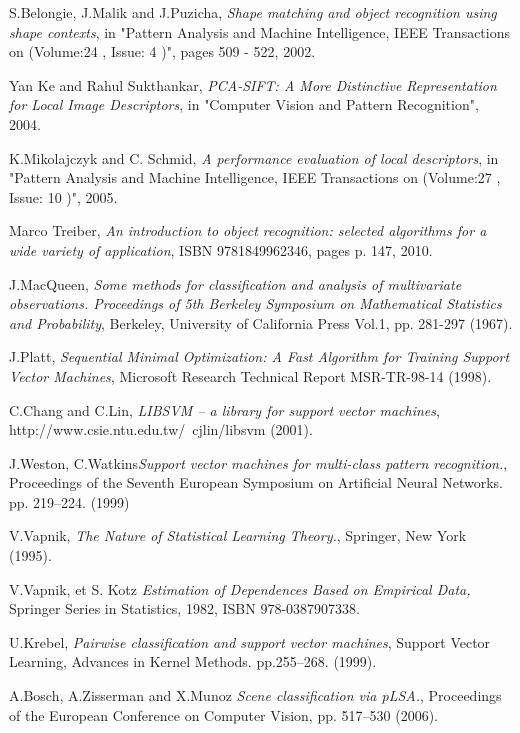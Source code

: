 \begin{thebibliography}{99}
 S.Belongie, J.Malik and J.Puzicha, \emph{Shape matching and object recognition using shape contexts}, in "Pattern Analysis and Machine Intelligence, IEEE Transactions on  (Volume:24 ,  Issue: 4 )", pages 509 - 522, 2002.

 Yan Ke and Rahul Sukthankar, \emph{PCA-SIFT: A More Distinctive Representation for Local Image Descriptors}, in "Computer Vision and Pattern Recognition", 2004.

 K.Mikolajczyk and C.	Schmid, \emph{A performance evaluation of local descriptors}, in "Pattern Analysis and Machine Intelligence, IEEE Transactions on  (Volume:27 ,  Issue: 10 )", 2005.

 Marco Treiber, \emph{An introduction to object recognition: selected algorithms for a wide variety of application}, ISBN 9781849962346, pages p. 147, 2010.

 J.MacQueen, \emph{Some methods for classification and analysis of multivariate observations. Proceedings of 5th Berkeley Symposium on Mathematical Statistics and Probability}, Berkeley, University of California Press Vol.1, pp. 281-297 (1967).

 J.Platt, \emph{Sequential Minimal Optimization: A Fast Algorithm for Training Support Vector Machines}, Microsoft Research Technical Report MSR-TR-98-14 (1998).

 C.Chang and C.Lin, \emph{LIBSVM – a library for support vector machines}, http://www.csie.ntu.edu.tw/~cjlin/libsvm (2001).

 J.Weston, C.Watkins\emph{Support vector machines for multi-class pattern recognition.}, Proceedings of the Seventh European Symposium on Artificial Neural Networks. pp. 219–224. (1999)

 V.Vapnik, \emph{The Nature of Statistical Learning Theory.}, Springer, New York (1995).

 V.Vapnik, et S. Kotz \emph{Estimation of Dependences Based on Empirical Data,} Springer Series in Statistics, 1982, ISBN 978-0387907338.

 U.Krebel, \emph{Pairwise classification and support vector machines}, Support Vector Learning, Advances in Kernel Methods. pp.255–268. (1999).

 A.Bosch, A.Zisserman and X.Munoz \emph{Scene
classification via pLSA.}, Proceedings of the European Conference on Computer Vision, pp. 517–530 (2006).


\end{thebibliography}
